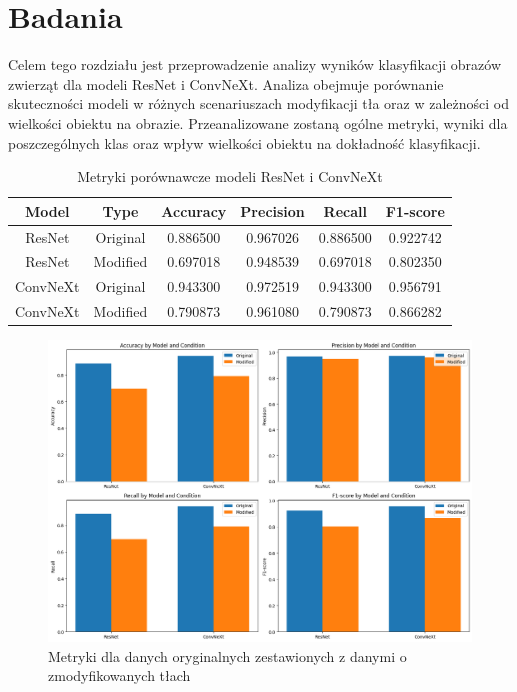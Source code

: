 \chapter*{Badania}

Celem tego rozdziału jest przeprowadzenie analizy wyników klasyfikacji obrazów zwierząt dla modeli ResNet i 
ConvNeXt. Analiza obejmuje porównanie skuteczności modeli w różnych scenariuszach modyfikacji tła oraz w zależności 
od wielkości obiektu na obrazie. Przeanalizowane zostaną ogólne metryki, wyniki dla poszczególnych klas oraz wpływ 
wielkości obiektu na dokładność klasyfikacji.


\begin{table}
	\centering
	\begin{tabular}{|c|c|c|c|c|c|}
		\hline
		\textbf{Model} & \textbf{Type} & \textbf{Accuracy} & \textbf{Precision} & \textbf{Recall} & \textbf{F1-score} \\
		\hline
		ResNet & Original & 0.886500 & 0.967026 & 0.886500 & 0.922742 \\
		\hline
		ResNet & Modified & 0.697018 & 0.948539 & 0.697018 & 0.802350 \\
		\hline
		ConvNeXt & Original & 0.943300 & 0.972519 & 0.943300 & 0.956791 \\
		\hline
		ConvNeXt & Modified & 0.790873 & 0.961080 & 0.790873 & 0.866282 \\
		\hline
	\end{tabular}
	\caption{Metryki porównawcze modeli ResNet i ConvNeXt}
	\label{tab:model_comparison_metrics}
\end{table}

\begin{figure}
	\centering\includegraphics[width=.9\textwidth]{img/overall_metrics}
	\caption{Metryki dla danych oryginalnych zestawionych z danymi o zmodyfikowanych tłach}  
    \label{rys:overall_metrics}
\end{figure}

